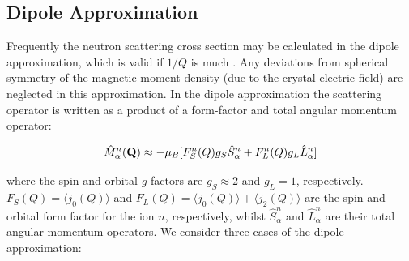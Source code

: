 \subsection{Dipole Approximation}

Frequently the neutron scattering cross section may be calculated 
in the dipole
approximation, which is valid if $1/Q$ is much 
. 
 Any deviations from spherical symmetry of the magnetic moment density
(due to the crystal electric field) are neglected in this approximation.
In the dipole approximation the scattering operator is written as a product of a form-factor and total angular momentum %
operator: 



\begin{equation}
\hat M^{n}_{\alpha}(\mathbf Q) \approx -\mu_B[F^n_S(Q) g_S \hat S^{n}_{\alpha} + F^n_L(Q) g_L \hat L^{n}_{\alpha}]
\end{equation}
 
\noindent where the spin and orbital $g$-factors 
are $g_S \approx 2$ and $g_L=1$, respectively. $F_S(Q)=\langle j_0 (Q) \rangle$ and
 $F_L(Q)=\langle j_0 (Q) \rangle + \langle j_2 (Q) \rangle$ are the spin and orbital form factor for the ion $n$, %
respectively, whilst $\hat S^{n}_{\alpha}$ and $\hat L^{n}_{\alpha}$ are their total angular momentum operators. We %
consider
three cases of the dipole approximation:

